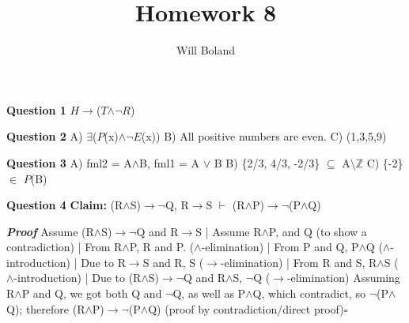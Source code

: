 \documentclass{article}
\begin{document}
\title{Homework 8}
\author{Will Boland}
\maketitle

\textbf{Question 1}\newline
$H$$\rightarrow$($T$$\wedge$$\neg$$R$)\newline\newline

\textbf{Question 2}\newline
A)	$\exists$($P$(x)$\wedge$$\neg$$E$(x))\newline
B)	All positive numbers are even.\newline
C)	(1,3,5,9)\newline\newline

\textbf{Question 3}\newline
A)	fml2 = A$\wedge$B, fml1 = A $\lor$ B\newline
B)	\{2/3, 4/3, -2/3\} $\subseteq$ A$\setminus$$\mathbb{Z}$\newline
C)	\{-2\} $\in$ $P$(B)\newline\newline

\textbf{Question 4}\newline
\textbf{Claim: } (R$\wedge$S)$\rightarrow$$\neg$Q, R$\rightarrow$S $\vdash$ (R$\wedge$P)$\rightarrow$$\neg$(P$\wedge$Q)\newline

\textbf{\textit{Proof}}\newline
Assume (R$\wedge$S)$\rightarrow$$\neg$Q and R$\rightarrow$S\newline
|	Assume R$\wedge$P, and Q (to show a contradiction)\newline
|	From R$\wedge$P, R and P. ($\wedge$-elimination)\newline
|	From P and Q, P$\wedge$Q ($\wedge$-introduction)\newline
|	Due to R$\rightarrow$S and R, S ($\rightarrow$-elimination)\newline
|	From R and S, R$\wedge$S ($\wedge$-introduction)\newline
|	Due to (R$\wedge$S)$\rightarrow$$\neg$Q and R$\wedge$S, $\neg$Q ($\rightarrow$-elimination)\newline
Assuming R$\wedge$P and Q, we got both Q and $\neg$Q, as well as P$\wedge$Q, which contradict, so $\neg$(P$\wedge$Q); therefore (R$\wedge$P)$\rightarrow$$\neg$(P$\wedge$Q) (proof by contradiction/direct proof)$\square$\newline\newline
\end{document}
